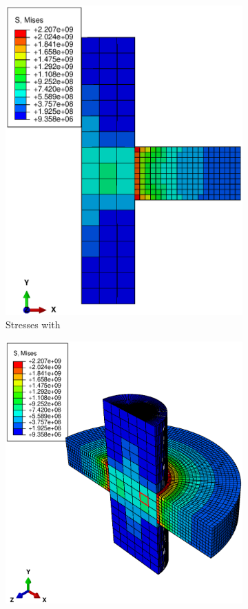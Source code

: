 \documentclass[12pt]{article}
\begin{document}
\begin{figure}[!htb]
  \centering
  \begin{subfigure}{.5\textwidth}
    \centering
    \includegraphics[width=0.95\linewidth]{pics/stress}
    \caption{Stresses with }
  \end{subfigure}%
  \begin{subfigure}{.5\textwidth}
    \centering
    \includegraphics[width=0.95\linewidth]{pics/stress3d}

\end{subfigure}
\end{figure}
\end{document}
